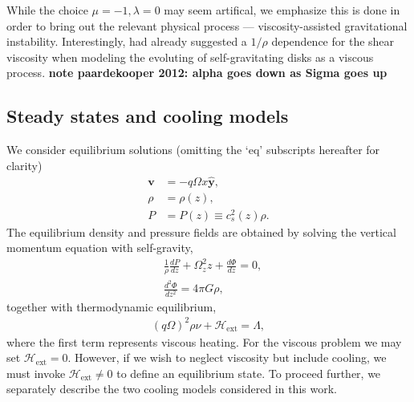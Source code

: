 While the choice $\mu=-1,\lambda=0$ may seem artifical, we emphasize
this is done in order to bring out the relevant physical process ---
viscosity-assisted gravitational instability. Interestingly, 
\cite{laughlin96b} had already suggested a $1/\rho$ dependence for the 
shear viscosity when modeling the evoluting of self-gravitating disks
as a viscous process.  
{\bf note paardekooper 2012: alpha goes down as Sigma goes up}

\subsection{Steady states and cooling models}

We consider equilibrium solutions (omitting the `eq' subscripts
hereafter for clarity)
\begin{align}
  \bm{v} &= -q\Omega x \hat{\bm{y}}, \\
  \rho   &= \rho(z),\\
  P      &= P(z) \equiv c_s^2(z)\rho.
\end{align} 
The equilibrium density and pressure fields are obtained by solving
the vertical momentum equation with self-gravity,
\begin{align}
  &\frac{1}{\rho}\frac{dP}{dz} +
  \Omega_z^2z + \frac{d\Phi}{dz} = 0, \label{vert_eq1}\\
 &\frac{d^2\Phi}{dz^2} = 4 \pi G \rho,\label{vert_eq2}
\end{align}
together with thermodynamic equilibrium,
\begin{align}\label{thermal_eq}
(q\Omega)^2\rho\nu + \mathcal{H}_\mathrm{ext} = \Lambda,
\end{align}
where the first term represents viscous heating. For the viscous
problem we may set $\mathcal{H}_\mathrm{ext}=0$. However, if we wish
to neglect viscosity but include cooling, we must invoke
$\mathcal{H}_\mathrm{ext}\neq0$ to define an equilibrium state.  
To proceed further, we separately describe the two cooling models
considered in this work. 

